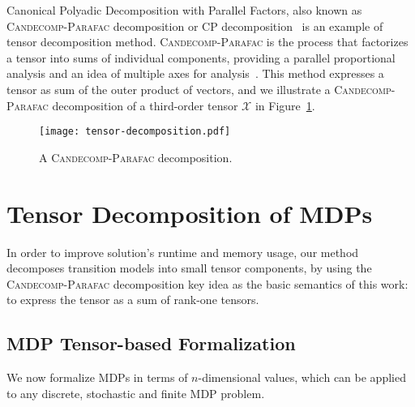 \documentclass[letterpaper]{article} %
\newcommand\candecompparafac{\textsc{Candecomp-Parafac}}
\begin{document}
Canonical Polyadic Decomposition with Parallel Factors, also known as \candecompparafac{} decomposition or CP decomposition~\cite{CANDECOMP&INDSCAL,PARAFAC2,Kiers-CP} is an example of tensor decomposition method. 
\candecompparafac{} is the process that factorizes a tensor into sums of individual components, providing a parallel proportional analysis and an idea of multiple axes for analysis~\cite{kolda_tensor_decomposition_applications_2009}. This method expresses a tensor as sum of the outer product of vectors, and we illustrate a \candecompparafac{} decomposition of a third-order tensor $\mathcal{X}$ in Figure~\ref{fig:tensor-cp}.

\begin{figure}[h]
  \centering
  \texttt{[image: tensor-decomposition.pdf]}
  \caption{\label{fig:tensor-cp}A \candecompparafac{} decomposition.}
\end{figure}




\section{Tensor Decomposition of MDPs}
In order to improve solution's runtime and memory usage, our method decomposes transition models into small tensor components, by using the \candecompparafac{} decomposition key idea as the basic semantics of this work: to express the tensor as a sum of rank-one tensors. 

\subsection{MDP Tensor-based Formalization}

We now formalize MDPs in terms of $n$-dimensional values, which can be applied to any discrete, stochastic and finite MDP problem. %
\end{document}
